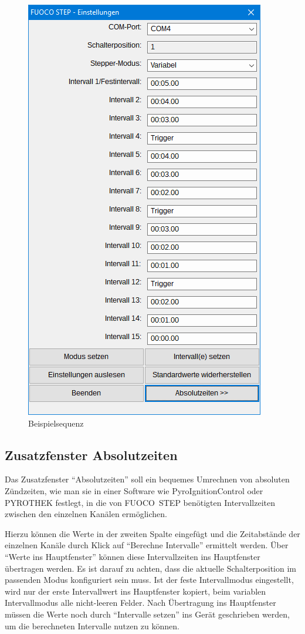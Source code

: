 \documentclass[paper=a4, open=any]{scrbook}
\begin{document}
				\begin{figure}[tb]
					\centering\includegraphics[width=.5\textwidth]{beispielshow}
					\caption{Beispielsequenz}
					\label{fig:beispielsequenz}
				\end{figure}

			\subsection{Zusatzfenster Absolutzeiten}
			\label{sec:absolutzeiten}
				Das Zusatzfenster \enquote{Absolutzeiten} soll ein bequemes Umrechnen von absoluten Zündzeiten, wie man sie in einer Software wie PyroIgnitionControl oder PYROTHEK festlegt, in die von FUOCO~STEP benötigten Intervallzeiten zwischen den einzelnen Kanälen ermöglichen.
				
				Hierzu können die Werte in der zweiten Spalte eingefügt und die Zeitabstände der einzelnen Kanäle durch Klick auf \enquote{Berechne Intervalle} ermittelt werden. Über \enquote{Werte ins Hauptfenster} können diese Intervallzeiten ins Hauptfenster übertragen werden. Es ist darauf zu achten, dass die aktuelle Schalterposition im passenden Modus konfiguriert sein muss. Ist der feste Intervallmodus eingestellt, wird nur der erste Intervallwert ins Hauptfenster kopiert, beim variablen Intervallmodus alle nicht-leeren Felder. Nach Übertragung ins Hauptfenster müssen die Werte noch durch \enquote{Intervalle setzen} ins Gerät geschrieben werden, um die berechneten Intervalle nutzen zu können.
				
\end{document}
